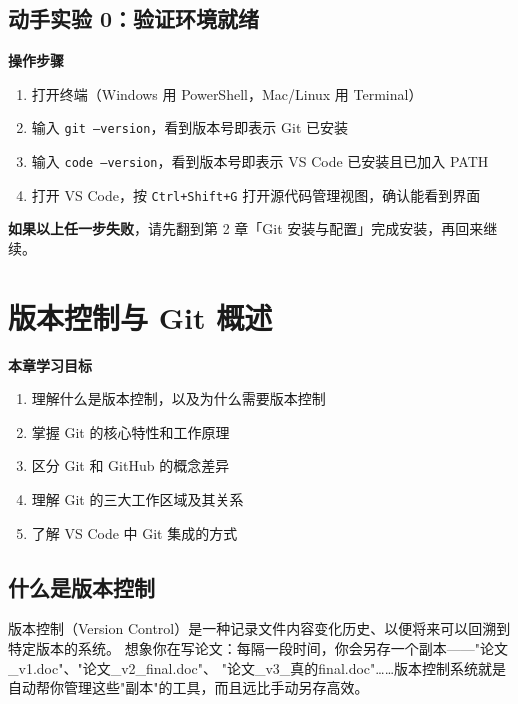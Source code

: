 \documentclass[12pt,a4paper,openany]{ctexbook}
\newenvironment{stepbox}{%
  \medskip
  \noindent\textbf{\faCogs\; 操作步骤}
  \smallskip
}{%
  \medskip
}
\begin{document}
\section{动手实验 0：验证环境就绪}

\begin{stepbox}
\begin{enumerate}[leftmargin=1.5em]
  \item 打开终端（Windows 用 PowerShell，Mac/Linux 用 Terminal）
  \item 输入 \texttt{git --version}，看到版本号即表示 Git 已安装
  \item 输入 \texttt{code --version}，看到版本号即表示 VS Code 已安装且已加入 PATH
  \item 打开 VS Code，按 \texttt{Ctrl+Shift+G} 打开源代码管理视图，确认能看到界面
\end{enumerate}
\end{stepbox}

\textbf{如果以上任一步失败}，请先翻到第 2 章「Git 安装与配置」完成安装，再回来继续。

\clearpage

\chapter{版本控制与 Git 概述}

\begin{infobox}
\textbf{本章学习目标}
\begin{enumerate}[leftmargin=1.5em]
  \item 理解什么是版本控制，以及为什么需要版本控制
  \item 掌握 Git 的核心特性和工作原理
  \item 区分 Git 和 GitHub 的概念差异
  \item 理解 Git 的三大工作区域及其关系
  \item 了解 VS Code 中 Git 集成的方式
\end{enumerate}
\end{infobox}

\section{什么是版本控制}

版本控制（Version Control）是一种记录文件内容变化历史、以便将来可以回溯到特定版本的系统。
想象你在写论文：每隔一段时间，你会另存一个副本——"论文\_v1.doc"、"论文\_v2\_final.doc"、
"论文\_v3\_真的final.doc"……版本控制系统就是自动帮你管理这些"副本"的工具，而且远比手动另存高效。
\end{document}

